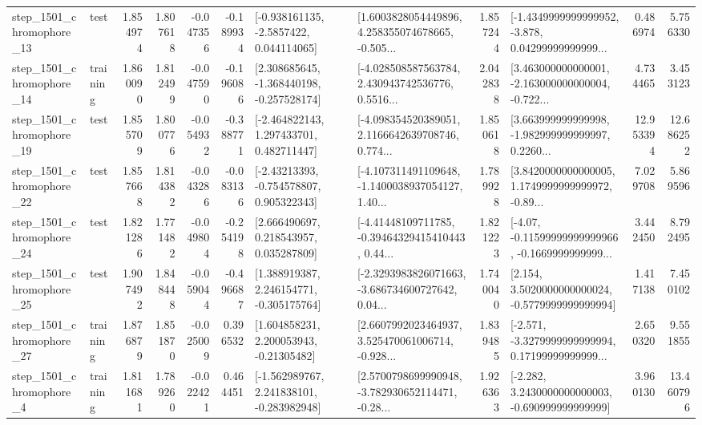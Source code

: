 \begin{tabular}{llrrrrllrlrr}
 step\_1501\_chromophore\_13 &      test &      1.854974 &    1.807618 &     -0.047356 & -0.189934 &     [-0.938161135, -2.5857422, 0.044114065] &  [1.6003828054449896, 4.258355074678665, -0.505... &       1.857244 &  [-1.4349999999999952, -3.878, 0.04299999999999... &            0.486974 &          5.756330 \\
 step\_1501\_chromophore\_14 &  training &      1.860090 &    1.812499 &     -0.047590 & -0.196086 &   [2.308685645, -1.368440198, -0.257528174] &  [-4.028508587563784, 2.430943742536776, 0.5516... &       2.042838 &  [3.463000000000001, -2.163000000000004, -0.722... &            4.734465 &          3.453123 \\
 step\_1501\_chromophore\_19 &      test &      1.855709 &    1.800776 &     -0.054932 & -0.388771 &    [-2.464822143, 1.297433701, 0.482711447] &  [-4.098354520389051, 2.1166642639708746, 0.774... &       1.850618 &  [3.663999999999998, -1.982999999999997, 0.2260... &           12.953394 &         12.686252 \\
 step\_1501\_chromophore\_22 &      test &      1.857668 &    1.814382 &     -0.043286 & -0.083136 &    [-2.43213393, -0.754578807, 0.905322343] &  [-4.107311491109648, -1.1400038937054127, 1.40... &       1.789928 &  [3.8420000000000005, 1.1749999999999972, -0.89... &            7.029708 &          5.869596 \\
 step\_1501\_chromophore\_24 &      test &      1.821286 &    1.771482 &     -0.049804 & -0.254198 &     [2.666490697, 0.218543957, 0.035287809] &  [-4.41448109711785, -0.39464329415410443, 0.44... &       1.821223 &  [-4.07, -0.11599999999999966, -0.1669999999999... &            3.442450 &          8.792495 \\
 step\_1501\_chromophore\_25 &      test &      1.907492 &    1.848448 &     -0.059044 & -0.496687 &    [1.388919387, 2.246154771, -0.305175764] &  [-2.3293983826071663, -3.686734600727642, 0.04... &       1.740040 &   [2.154, 3.5020000000000024, -0.5779999999999994] &            1.417138 &          7.450102 \\
 step\_1501\_chromophore\_27 &  training &      1.876879 &    1.851870 &     -0.025009 &  0.396532 &     [1.604858231, 2.200053943, -0.21305482] &  [2.6607992023464937, 3.525470061006714, -0.928... &       1.839485 &  [-2.571, -3.3279999999999994, 0.17199999999999... &            2.650320 &          9.551855 \\
  step\_1501\_chromophore\_4 &  training &      1.811681 &    1.789260 &     -0.022421 &  0.464451 &   [-1.562989767, 2.241838101, -0.283982948] &  [2.5700798699990948, -3.782930652114471, -0.28... &       1.926363 &   [-2.282, 3.2430000000000003, -0.690999999999999] &            3.960130 &         13.460796 \\

\end{tabular}
